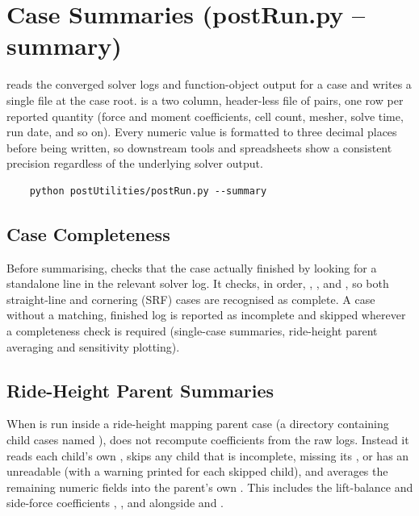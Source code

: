 \section{Case Summaries (postRun.py --summary)}
 reads the converged solver logs and function-object output for a case and writes a single  file at the case root.  is a two column, header-less file of  pairs, one row per reported quantity (force and moment coefficients, cell count, mesher, solve time, run date, and so on). Every numeric value is formatted to three decimal places before being written, so downstream tools and spreadsheets show a consistent precision regardless of the underlying solver output.

\begin{lstlisting}
    python postUtilities/postRun.py --summary
\end{lstlisting}

\subsection{Case Completeness}
Before summarising,  checks that the case actually finished by looking for a standalone  line in the relevant solver log. It checks, in order, , ,  and , so both straight-line and cornering (SRF) cases are recognised as complete. A case without a matching, finished log is reported as incomplete and skipped wherever a completeness check is required (single-case summaries, ride-height parent averaging and sensitivity plotting).

\subsection{Ride-Height Parent Summaries}
When  is run inside a ride-height mapping parent case (a directory containing child cases named ),  does not recompute coefficients from the raw logs. Instead it reads each child's own , skips any child that is incomplete, missing its , or has an unreadable  (with a warning printed for each skipped child), and averages the remaining numeric fields into the parent's own . This includes the lift-balance and side-force coefficients , ,  and  alongside  and .

